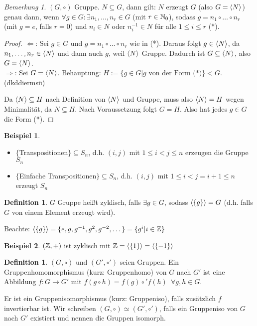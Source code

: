 \documentclass[12pt,a4paper]{article}
\newcounter{defcounter}[subsection]
\theoremstyle{definition}
\newtheorem{defi}[defcounter]{Definition}
\theoremstyle{remark}
\newtheorem*{bem}{Bemerkung}
\theoremstyle{definition}
\theoremstyle{definition}
\newtheorem*{bsp}{Beispiel}
\theoremstyle{plain}
\theoremstyle{plain}
\begin{document}
\begin{bem}
	$(G,\circ)$ Gruppe. $N\subseteq G$, dann gilt: $N$ erzeugt $G$ (also $G = \langle N\rangle$) genau dann, wenn $\forall g\in G : \exists n_1,\dots,n_r\in G$ (mit $r\in \mathbb N_0$), sodass $g = n_1\circ \dots \circ n_r$ (mit $g=e$, falls $r=0$) und $n_i\in N$ oder $n_i^{-1}\in N$ für alle $1\leq i\leq r$ (*).
\end{bem}

\begin{proof}
	\glqq$\Leftarrow$\grqq: Sei $g\in G$ und $g = n_1\circ\dots \circ n_r$ wie in (*). Daraus folgt $g\in \langle N\rangle$, da $n_1,\dots,n_r\in \langle N\rangle$ und dann auch $g$, weil $\langle N\rangle$ Gruppe. Dadurch ist $G\subseteq \langle N\rangle$, also $G = \langle N\rangle$.\\
	\glqq$\Rightarrow$\grqq: Sei $G = \langle N\rangle$. Behauptung: $H:=\{g\in G| g \mbox{ von der Form (*)}\}<G$. (dkddiermsü)
	
	Da $\langle N\rangle\subseteq H$ nach Definition von $\langle N\rangle$ und Gruppe, muss also $\langle N\rangle = H$ wegen Minimalität, da $N\subseteq H$. Nach Voraussetzung folgt $G = H$. Also hat jedes $g\in G$ die Form (*).
\end{proof}

\begin{bsp}
	\leavevmode
	\begin{itemize}
		\item $\{$Transpositionen$\}\subseteq S_n$, d.h. $(i,j)$ mit $1\leq i<j\leq n$ erzeugen die Gruppe $S_n$
		\item $\{$Einfache Transpositionen$\}\subseteq S_n$, d.h. $(i,j)$ mit $1\leq i<j=i+1\leq n$ erzeugt $S_n$
	\end{itemize}
	
\end{bsp}

\begin{defi}
	$G$ Gruppe heißt zyklisch, falls $\exists g\in G$, sodass $\langle\{g\}\rangle = G$ (d.h. falls $G$ von einem Element erzeugt wird).
\end{defi}

\noindent Beachte: $\langle\{g\}\rangle = \{e, g, g^{-1}, g^2, g^{-2},\dots\} = \{g^i|i\in\mathbb Z\}$

\begin{bsp}

 $(\mathbb Z,+)$ ist zyklisch mit $\mathbb Z =\langle\{1\}\rangle = \langle\{-1\}\rangle$

\end{bsp}

\begin{defi}
	$(G,\circ)$ und $(G',\circ')$ seien Gruppen. Ein Gruppenhomomorphismus (kurz: Gruppenhomo) von $G$ nach $G'$ ist eine Abbildung $f\colon G\to G'$ mit $f(g\circ h) = f(g)\circ'f(h)\enspace \forall g, h\in G$.
	
	Er ist ein Gruppenisomorphismus (kurz: Gruppeniso), falls zusätzlich $f$ invertierbar ist. Wir schreiben $(G,\circ)\simeq (G',\circ')$, falls ein Gruppeniso von $G$ nach $G'$ existiert und nennen die Gruppen isomorph.
\end{defi}
\end{document}
